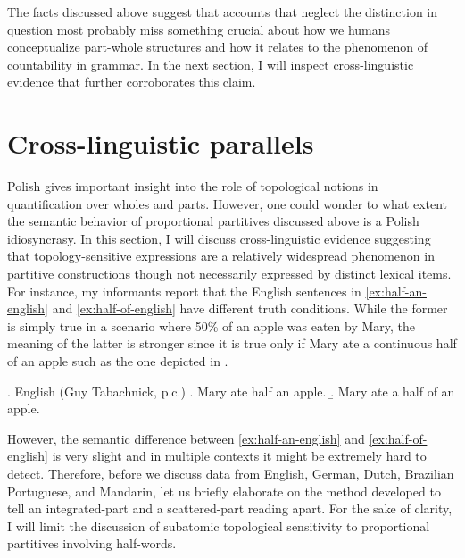 The facts discussed above suggest that accounts that neglect the distinction in question most probably miss something crucial about how we humans conceptualize part-whole structures and how it relates to the phenomenon of countability in grammar. In the next section, I will inspect cross-linguistic evidence that further corroborates this claim.

\section{Cross-linguistic parallels}\label{sec:cross-linguistic-parallels}

Polish gives important insight into the role of topological notions in quantification over wholes and parts. However, one could wonder to what extent the semantic behavior of proportional partitives discussed above is a Polish idiosyncrasy. In this section, I will discuss cross-linguistic evidence suggesting that to\-po\-logy-sensitive expressions are a relatively widespread phenomenon in partitive constructions though not necessarily expressed by distinct lexical items. For instance, my informants report that the English sentences in \ref{ex:half-an-english} and \ref{ex:half-of-english} have different truth conditions. While the former is simply true in a scenario where 50\% of an apple was eaten by Mary, the meaning of the latter is stronger since it is true only if Mary ate a continuous half of an apple such as the one depicted in .

\ex. English (Guy Tabachnick, p.c.)\label{ex:half-an-half-of-english}
\a. Mary ate half an apple.\label{ex:half-an-english}
\b. Mary ate a half of an apple.\label{ex:half-of-english}

However, the semantic difference between \ref{ex:half-an-english} and \ref{ex:half-of-english} is very slight and in multiple contexts it might be extremely hard to detect. Therefore, before we discuss data from English, German, Dutch, Brazilian Portuguese, and Mandarin, let us briefly elaborate on the method developed to tell an integrated-part and a scattered-part reading apart. For the sake of clarity, I will limit the discussion of subatomic topological sensitivity to proportional partitives involving half-words.

